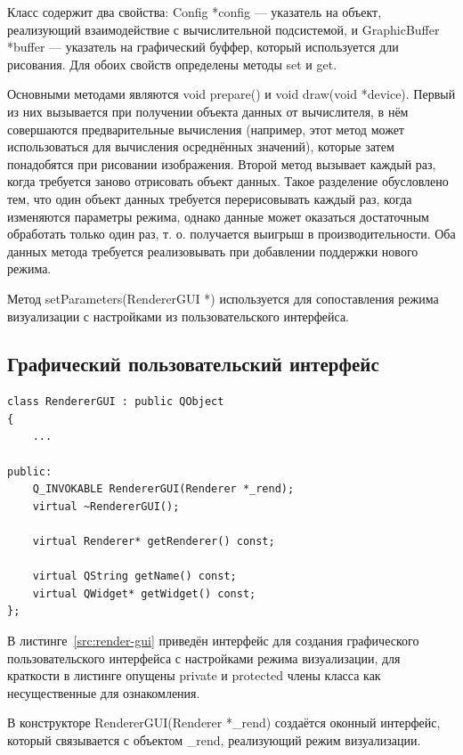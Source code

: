 \documentclass[a4paper,12pt]{extarticle}
\begin{document}
Класс содержит два свойства: \textsf{Config *config} --- указатель на объект, реализующий взаимодействие с вычислительной подсистемой, и \textsf{GraphicBuffer *buffer} --- указатель на графический буффер, который используется дли рисования. Для обоих свойств определены методы \textsf{set} и \textsf{get}.

Основными методами являются \textsf{void prepare()} и \textsf{void draw(void *device)}. Первый из них вызывается при получении объекта данных от вычислителя, в нём совершаются предварительные вычисления (например, этот метод может использоваться для вычисления осреднённых значений), которые затем понадобятся при рисовании изображения. Второй метод вызывает каждый раз, когда требуется заново отрисовать объект данных. Такое разделение обусловлено тем, что один объект данных требуется перерисовывать каждый раз, когда изменяются параметры режима, однако данные может оказаться достаточным обработать только один раз, т. о. получается выигрыш в производительности. Оба данных метода требуется реализовывать при добавлении поддержки нового режима.

Метод \textsf{setParameters(RendererGUI *)} используется для сопоставления режима визуализации с настройками из пользовательского интерфейса.

\subsection{Графический пользовательский интерфейс}

\begin{lstlisting}[label=src:render-gui,title=Листинг В.2 --- Реализация графического интерфейса для настроек режима визуализации]
class RendererGUI : public QObject
{
    ...

public:
    Q_INVOKABLE RendererGUI(Renderer *_rend);
    virtual ~RendererGUI();

    virtual Renderer* getRenderer() const;

    virtual QString getName() const;
    virtual QWidget* getWidget() const;
};
\end{lstlisting}

В листинге~\ref{src:render-gui} приведён интерфейс для создания графического пользовательского интерфейса с настройками режима визуализации, для краткости в листинге опущены \textsf{private} и \textsf{protected} члены класса как несущественные для ознакомления.

В конструкторе \textsf{RendererGUI(Renderer *\_rend)} создаётся оконный интерфейс, который связывается с объектом \textsf{\_rend}, реализующий режим визуализации.
\end{document}
